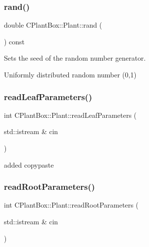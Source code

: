 \subsubsection{\texorpdfstring{rand()}{rand()}}
{\footnotesize\ttfamily double C\+Plant\+Box\+::\+Plant\+::rand (\begin{DoxyParamCaption}{ }\end{DoxyParamCaption}) const\hspace{0.3cm}{\ttfamily [inline]}}



Sets the seed of the random number generator. 

Uniformly distributed random number (0,1) \mbox{\label{classCPlantBox_1_1Plant_a013fc03e731d77cce6b4e96bd31a428d}} 
\subsubsection{\texorpdfstring{read\+Leaf\+Parameters()}{readLeafParameters()}}
{\footnotesize\ttfamily int C\+Plant\+Box\+::\+Plant\+::read\+Leaf\+Parameters (\begin{DoxyParamCaption}\item[{std\+::istream \&}]{cin }\end{DoxyParamCaption})}

added copypaste \mbox{\label{classCPlantBox_1_1Plant_a41f9274cd87aef972373c96be1c92ad3}} 
\subsubsection{\texorpdfstring{read\+Root\+Parameters()}{readRootParameters()}}
{\footnotesize\ttfamily int C\+Plant\+Box\+::\+Plant\+::read\+Root\+Parameters (\begin{DoxyParamCaption}\item[{std\+::istream \&}]{cin }\end{DoxyParamCaption})}



